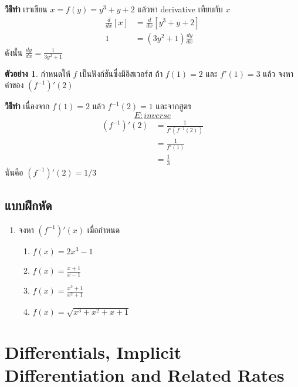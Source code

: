 \documentclass[
]{book}
\theoremstyle{definition}
\theoremstyle{definition}
\newtheorem{example}{ตัวอย่าง}[chapter]
\theoremstyle{definition}
\theoremstyle{definition}
\theoremstyle{remark}
\begin{document}
\textbf{วิธีทำ} เราเขียน \(x = f(y) = y^3+y+2\) แล้วหา derivative เทียบกับ \(x\)
\begin{equation}   \begin{aligned}
    \frac{d}{dx}[x]  &= \frac{d}{dx}[y^3+y+2] \\
    1 &= (3y^2+1)\frac{dy}{dx}
  \end{aligned} \end{equation} ดังนั้น
\(\displaystyle \frac{dy}{dx} = \frac{1}{3y^2+1}\)

\begin{example}
กำหนดให้ \(f\) เป็นฟังก์ชันซึ่งมีอิสเวอร์ส ถ้า \(f(1) = 2\) และ \(f'(1) = 3\) แล้ว
จงหาค่าของ \((f^{-1})'(2)\)
\end{example}

\textbf{วิธีทำ} เนื่องจาก \(f(1) = 2\) แล้ว \(f^{-1}(2) = 1\) และจากสูตร
~\hyperref[E:inverse]{\[E:inverse\]} \begin{equation}   \begin{aligned}
    (f^{-1})'(2)
    &= \frac{1}{f'(f^{-1}(2))} \\
    &= \frac{1}{f'(1)} \\
    &= \frac{1}{3}
  \end{aligned} \end{equation} นั่นคือ \(\displaystyle (f^{-1})'(2) = 1/3\)

\subsection{แบบฝึกหัด}\label{uxe41uxe1auxe1auxe1duxe01uxe2buxe14-1}

\begin{enumerate}
\def\labelenumi{\arabic{enumi}.}
\item
  จงหา \((f^{-1})'(x)\) เมื่อกำหนด

  \begin{enumerate}
  \def\labelenumii{\arabic{enumii}.}
  \item
    \(\displaystyle f(x) =  2x^3-1\)
  \item
    \(\displaystyle f(x) = \frac{x+1}{x-1}\)
  \item
    \(\displaystyle f(x) = \frac{x^3+1}{x^2+1}\)
  \item
    \(\displaystyle f(x) = \sqrt{x^3+x^2+x+1}\)
  \end{enumerate}
\end{enumerate}

\section{Differentials, Implicit Differentiation and Related Rates}\label{differentials-implicit-differentiation-and-related-rates}
\end{document}
